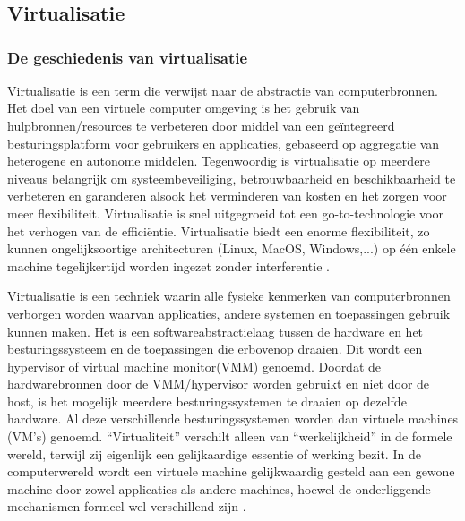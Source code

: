 \chapter{}
\label{ch:stand-van-zaken}

\section{Virtualisatie}
\subsection{De geschiedenis van virtualisatie}

Virtualisatie is een term die verwijst naar de abstractie van computerbronnen. Het doel van een virtuele computer omgeving is het gebruik van hulpbronnen/resources te verbeteren door middel van een geïntegreerd besturingsplatform voor gebruikers en applicaties, gebaseerd op aggregatie van heterogene en autonome middelen. Tegenwoordig is virtualisatie op meerdere niveaus belangrijk om systeembeveiliging, betrouwbaarheid en beschikbaarheid te verbeteren en garanderen alsook het verminderen van kosten en het zorgen voor meer flexibiliteit. Virtualisatie is snel uitgegroeid tot een go-to-technologie voor het verhogen van de efficiëntie. Virtualisatie biedt een enorme flexibiliteit, zo kunnen ongelijksoortige architecturen (Linux, MacOS, Windows,...) op één enkele machine tegelijkertijd worden ingezet zonder interferentie \autocite{Ameen2013}.

Virtualisatie is een techniek waarin alle fysieke kenmerken van computerbronnen verborgen worden waarvan applicaties, andere systemen en toepassingen gebruik kunnen maken. Het is een softwareabstractielaag tussen de hardware en het besturingssysteem en de toepassingen die erbovenop draaien. Dit wordt een hypervisor of virtual machine monitor(VMM) genoemd. Doordat de hardwarebronnen door de VMM/hypervisor worden gebruikt en niet door de host, is het mogelijk meerdere besturingssystemen te draaien op dezelfde hardware. Al deze verschillende besturingssystemen worden dan virtuele machines (VM's) genoemd. “Virtualiteit” verschilt alleen van “werkelijkheid” in de formele wereld, terwijl zij eigenlijk een gelijkaardige essentie of werking bezit. In de computerwereld wordt een virtuele machine gelijkwaardig gesteld aan een gewone machine door zowel applicaties als andere machines, hoewel de onderliggende mechanismen formeel wel verschillend zijn \autocite{Ameen2013}.

